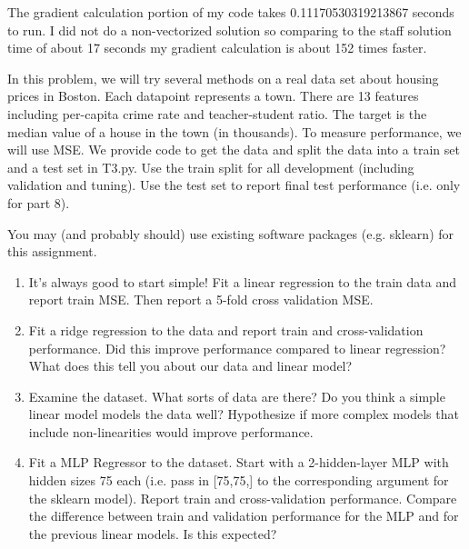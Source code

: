 \documentclass[submit]{harvardml}
\begin{document}
\begin{enumerate}
    The gradient calculation portion of my code takes 0.11170530319213867 seconds  to run. I did not do a non-vectorized solution so comparing to the staff solution time of about 17 seconds my gradient calculation is about 152 times faster.
\end{enumerate}


\newpage

\begin{problem}

  In this problem, we will try several methods on a real data set about housing prices in Boston. Each datapoint represents a town. There are 13 features including per-capita crime rate and teacher-student ratio. The target is the median value of a house in the town (in thousands). To measure performance, we will use MSE. We provide code to get the data and split the data into a train set and a test set in T3.py. Use the train split for all development (including validation and tuning). Use the test set to report final test performance (i.e. only for part 8).
  
  You may (and probably should) use existing software packages (e.g. sklearn) for this
  assignment.

\begin{enumerate}

  \item It's always good to start simple! Fit a linear regression to the train data and report train MSE. Then report a 5-fold cross validation MSE.
  
  \item Fit a ridge regression to the data and report train and cross-validation performance. Did this improve performance compared to linear regression? What does this tell you about our data and linear model?
  
  \item Examine the dataset. What sorts of data are there? Do you think a simple linear model models the data well? Hypothesize if more complex models that include non-linearities would improve performance.
    
  \item Fit a MLP Regressor to the dataset. Start with a 2-hidden-layer MLP with hidden sizes 75 each (i.e. pass in [75,75,] to the corresponding argument for the sklearn model). Report train and cross-validation performance. Compare the difference between train and validation performance for the MLP and for the previous linear models. Is this expected?
  

\end{enumerate}
\end{problem}
\end{document}
